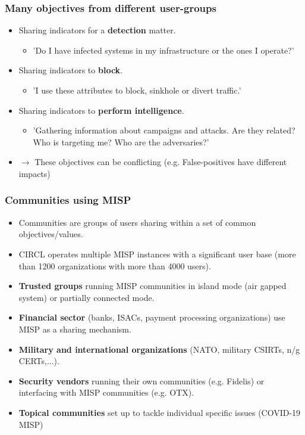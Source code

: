 \begin{frame}
\frametitle{Many objectives from different user-groups}
        \begin{itemize}
                \item Sharing indicators for a {\bf detection} matter.
                        \begin{itemize}
                                \item 'Do I have infected systems in my infrastructure or the ones I operate?'
                        \end{itemize}
                \item Sharing indicators to {\bf block}.
                        \begin{itemize}
                                \item 'I use these attributes to block, sinkhole or divert traffic.'
                        \end{itemize}
                \item Sharing indicators to {\bf perform intelligence}.
                        \begin{itemize}
                                \item 'Gathering information about campaigns and attacks. Are they related? Who is targeting me? Who are the adversaries?'
                        \end{itemize}
                \item $\rightarrow$ These objectives can be conflicting (e.g. False-positives have different impacts)
        \end{itemize}
\end{frame}

\begin{frame}
 \frametitle{Communities using MISP}
 \begin{itemize}
     \item Communities are groups of users sharing within a set of common objectives/values.
     \item CIRCL operates multiple MISP instances with a significant user base (more than 1200 organizations with more than 4000 users).
         \item {\bf Trusted groups} running MISP communities in island mode (air gapped system) or partially connected mode.
     \item {\bf Financial sector} (banks, ISACs, payment processing organizations) use MISP as a sharing mechanism.
     \item {\bf Military and international organizations} (NATO, military CSIRTs, n/g CERTs,...).
     \item {\bf Security vendors} running their own communities (e.g. Fidelis) or interfacing with MISP communities (e.g. OTX).
         \item {\bf Topical communities} set up to tackle individual specific issues (COVID-19 MISP)
 \end{itemize}
\end{frame}

